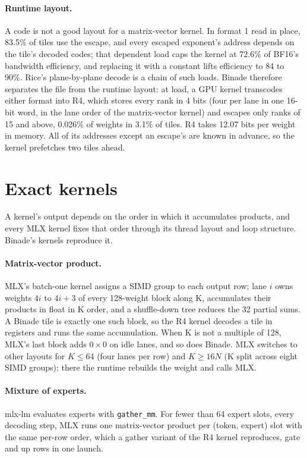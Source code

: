 \documentclass[11pt]{article}
\begin{document}
\paragraph{Runtime layout.} A code is not a good layout for a matrix-vector kernel. In format 1 read in place, 83.5\% of tiles use the escape, and every escaped exponent's address depends on the tile's decoded codes; that dependent load caps the kernel at 72.6\% of BF16's bandwidth efficiency, and replacing it with a constant lifts efficiency to 84 to 90\%. Rice's plane-by-plane decode is a chain of such loads. Binade therefore separates the file from the runtime layout: at load, a GPU kernel transcodes either format into R4, which stores every rank in 4 bits (four per lane in one 16-bit word, in the lane order of the matrix-vector kernel) and escapes only ranks of 15 and above, 0.026\% of weights in 3.1\% of tiles. R4 takes 12.07 bits per weight in memory. All of its addresses except an escape's are known in advance, so the kernel prefetches two tiles ahead.

\section{Exact kernels}
\label{sec:kernels}

A kernel's output depends on the order in which it accumulates products, and every MLX kernel fixes that order through its thread layout and loop structure. Binade's kernels reproduce it.

\paragraph{Matrix-vector product.} MLX's batch-one kernel assigns a SIMD group to each output row; lane $i$ owns weights $4i$ to $4i+3$ of every 128-weight block along K, accumulates their products in float in K order, and a shuffle-down tree reduces the 32 partial sums. A Binade tile is exactly one such block, so the R4 kernel decodes a tile in registers and runs the same accumulation. When K is not a multiple of 128, MLX's last block adds $0 \times 0$ on idle lanes, and so does Binade. MLX switches to other layouts for $K \le 64$ (four lanes per row) and $K \ge 16N$ (K split across eight SIMD groups); there the runtime rebuilds the weight and calls MLX.

\paragraph{Mixture of experts.} mlx-lm evaluates experts with \texttt{gather\_mm}. For fewer than 64 expert slots, every decoding step, MLX runs one matrix-vector product per (token, expert) slot with the same per-row order, which a gather variant of the R4 kernel reproduces, gate and up rows in one launch.
\end{document}
